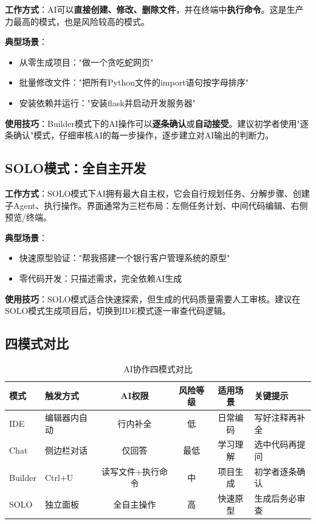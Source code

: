 \textbf{工作方式}：AI可以\textbf{直接创建、修改、删除文件}，并在终端中\textbf{执行命令}。这是生产力最高的模式，也是风险较高的模式。

\textbf{典型场景}：
\begin{itemize}[leftmargin=2em]
  \item 从零生成项目："做一个贪吃蛇网页"
  \item 批量修改文件："把所有Python文件的import语句按字母排序"
  \item 安装依赖并运行："安装flask并启动开发服务器"
\end{itemize}

\textbf{使用技巧}：Builder模式下的AI操作可以\textbf{逐条确认}或\textbf{自动接受}。建议初学者使用"逐条确认"模式，仔细审核AI的每一步操作，逐步建立对AI输出的判断力。

\subsection{SOLO模式：全自主开发}

\textbf{工作方式}：SOLO模式下AI拥有最大自主权，它会自行规划任务、分解步骤、创建子Agent、执行操作。界面通常为三栏布局：左侧任务计划、中间代码编辑、右侧预览/终端。

\textbf{典型场景}：
\begin{itemize}[leftmargin=2em]
  \item 快速原型验证："帮我搭建一个银行客户管理系统的原型"
  \item 零代码开发：只描述需求，完全依赖AI生成
\end{itemize}

\textbf{使用技巧}：SOLO模式适合快速探索，但生成的代码质量需要人工审核。建议在SOLO模式生成项目后，切换到IDE模式逐一审查代码逻辑。

\subsection{四模式对比}

\begin{table}[H]
\centering
\begin{tabular}{llccc p{3cm}}
\toprule
\textbf{模式} & \textbf{触发方式} & \textbf{AI权限} & \textbf{风险等级} & \textbf{适用场景} & \textbf{关键提示} \\
\midrule
IDE & 编辑器内自动 & 行内补全 & 低 & 日常编码 & 写好注释再补全 \\
Chat & 侧边栏对话 & 仅回答 & 最低 & 学习理解 & 选中代码再提问 \\
Builder & Ctrl+U & 读写文件+执行命令 & 中 & 项目生成 & 初学者逐条确认 \\
SOLO & 独立面板 & 全自主操作 & 高 & 快速原型 & 生成后务必审查 \\
\bottomrule
\end{tabular}
\caption{AI协作四模式对比}
\end{table}


